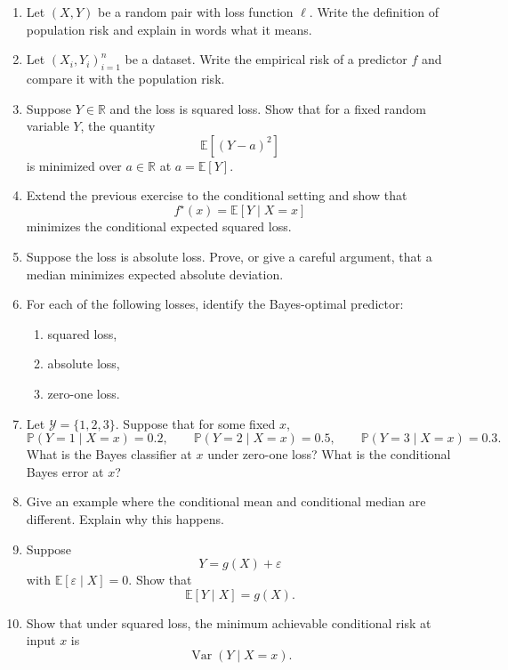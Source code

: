 \begin{enumerate}
    \item Let $(X,Y)$ be a random pair with loss function $\ell$. Write the definition of population risk and explain in words what it means.

    \item Let $(X_i,Y_i)_{i=1}^n$ be a dataset. Write the empirical risk of a predictor $f$ and compare it with the population risk.

    \item Suppose $Y\in\mathbb{R}$ and the loss is squared loss. Show that for a fixed random variable $Y$, the quantity
    \[
    \mathbb{E}[(Y-a)^2]
    \]
    is minimized over $a\in\mathbb{R}$ at $a=\mathbb{E}[Y]$.

    \item Extend the previous exercise to the conditional setting and show that
    \[
    f^\star(x)=\mathbb{E}[Y\mid X=x]
    \]
    minimizes the conditional expected squared loss.

    \item Suppose the loss is absolute loss. Prove, or give a careful argument, that a median minimizes expected absolute deviation.

    \item For each of the following losses, identify the Bayes-optimal predictor:
    \begin{enumerate}
        \item squared loss,
        \item absolute loss,
        \item zero-one loss.
    \end{enumerate}

    \item Let $\mathcal{Y}=\{1,2,3\}$. Suppose that for some fixed $x$,
    \[
    \mathbb{P}(Y=1\mid X=x)=0.2,\qquad
    \mathbb{P}(Y=2\mid X=x)=0.5,\qquad
    \mathbb{P}(Y=3\mid X=x)=0.3.
    \]
    What is the Bayes classifier at $x$ under zero-one loss? What is the conditional Bayes error at $x$?

    \item Give an example where the conditional mean and conditional median are different. Explain why this happens.

    \item Suppose
    \[
    Y = g(X) + \varepsilon
    \]
    with $\mathbb{E}[\varepsilon\mid X]=0$. Show that
    \[
    \mathbb{E}[Y\mid X]=g(X).
    \]

    \item Show that under squared loss, the minimum achievable conditional risk at input $x$ is
    \[
    \operatorname{Var}(Y\mid X=x).
    \]


\end{enumerate}
